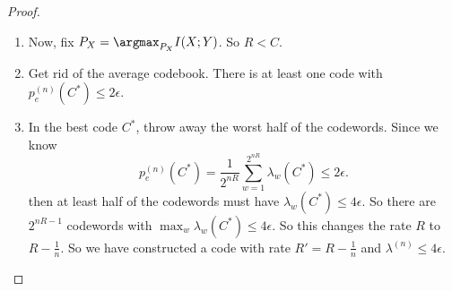\begin{proof}
\begin{enumerate}
\item Now, fix $P_X = \argmax_{P_X} I(X;Y)$. So $R <  C$.
\item Get rid of the average codebook. There is at least one code with $p_e^{(n)}(C^*) \leq 2\epsilon$.
\item In the best code $C^*$, throw away the worst half of the codewords. Since we know
\[
p_e^{(n)}(C^*) = \frac{1}{2^{nR}} \sum_{w=1}^{2^{nR}} \lambda_w(C^*) \leq 2\epsilon.
\]
then at least half of the codewords must have $\lambda_w(C^*) \leq 4\epsilon$. So there are $2^{nR -1}$ codewords with $\max_w \lambda_w(C^*) \leq 4\epsilon$. So this changes the rate $R$ to $R - \frac{1}{n}$. So we have constructed a code with rate $R' = R - \frac{1}{n}$ and $\lambda^{(n)} \leq 4\epsilon$.
\end{enumerate}
\end{proof}















